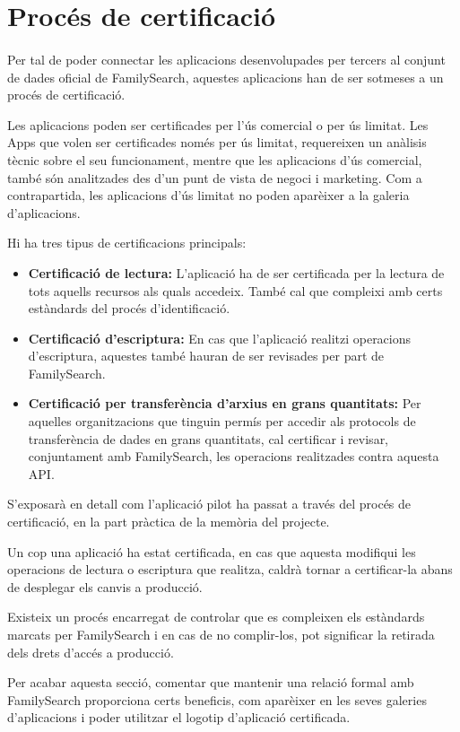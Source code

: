 \section{Procés de certificació}

    \paragraph{}
    Per tal de poder connectar les aplicacions desenvolupades per tercers al conjunt de dades oficial de FamilySearch, aquestes aplicacions han de ser sotmeses a un procés de certificació.

    Les aplicacions poden ser certificades per l'ús comercial o per ús limitat. Les Apps que volen ser certificades només per ús limitat, requereixen un anàlisis tècnic sobre el seu funcionament, mentre que les aplicacions d'ús comercial, també són analitzades des d'un punt de vista de negoci i marketing. Com a contrapartida, les aplicacions d'ús limitat no poden aparèixer a la galeria d'aplicacions.

    Hi ha tres tipus de certificacions principals:

    \begin{itemize}
        \item \textbf{Certificació de lectura:} L'aplicació ha de ser certificada per la lectura de tots aquells recursos als quals accedeix. També cal que compleixi amb certs estàndards del procés d'identificació.
        \item \textbf{Certificació d'escriptura:} En cas que l'aplicació realitzi operacions d'escrip\-tura, aquestes també hauran de ser revisades per part de FamilySearch.
        \item \textbf{Certificació per transferència d'arxius en grans quantitats:} Per aquelles organitzacions que tinguin permís per accedir als protocols de transferència de dades en grans quantitats, cal certificar i revisar, conjuntament amb Family\-Search, les operacions realitzades contra aquesta API.
    \end{itemize}

    S'exposarà en detall com l'aplicació pilot ha passat a través del procés de certificació, en la part pràctica de la memòria del projecte.

    Un cop una aplicació ha estat certificada, en cas que aquesta modifiqui les o\-pe\-ra\-cions de lectura o escriptura que realitza, caldrà tornar a certificar-la abans de desplegar els canvis a producció.

    Existeix un procés encarregat de controlar que es compleixen els estàndards marcats per FamilySearch i en cas de no complir-los, pot significar la retirada dels drets d'accés a producció.

    Per acabar aquesta secció, comentar que mantenir una relació formal amb Family\-Search proporciona certs beneficis, com aparèixer en les seves galeries d'aplicacions i poder utilitzar el logotip d'aplicació certificada.
